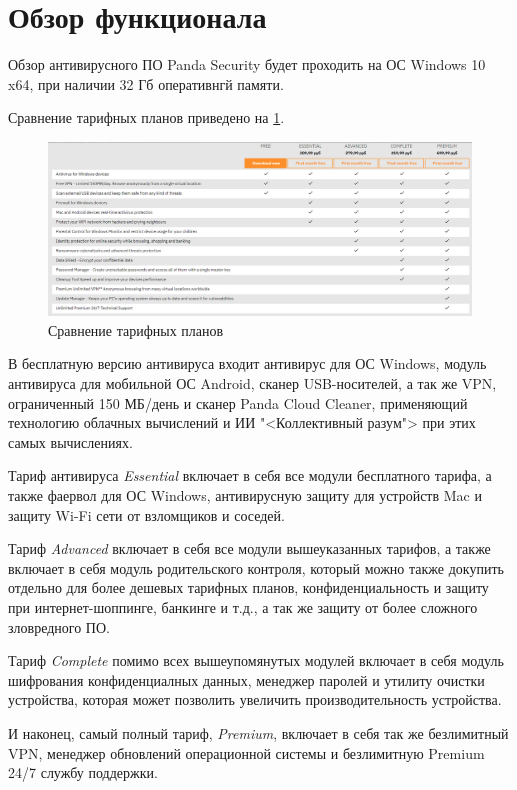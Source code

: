     \section{Обзор функционала}
        Обзор антивирусного ПО Panda Security будет проходить на ОС Windows 10 x64, при наличии 32 Гб оперативнгй памяти.\par
        Сравнение тарифных планов приведено на \ref{tariff_compare}.\par
        \begin{figure}[h]
            \centering
            \includegraphics[width=\textwidth]{pics/compare_tariffs}
            \caption{Сравнение тарифных планов}
            \label{tariff_compare}
        \end{figure}
        В бесплатную версию антивируса входит антивирус для ОС Windows, модуль антивируса для мобильной ОС
        Android, сканер USB-носителей, а так же VPN, ограниченный 150 МБ/день и сканер Panda Cloud Cleaner,
        применяющий технологию облачных вычислений и ИИ "<Коллективный разум"> при этих самых вычислениях.\par
        Тариф антивируса \emph{Essential} включает в себя все модули бесплатного тарифа, а также фаервол для 
        ОС Windows, антивирусную защиту для устройств Mac и защиту Wi-Fi сети от взломщиков и соседей.\par
        Тариф \emph{Advanced} включает в себя все модули вышеуказанных тарифов, а также включает в себя
        модуль родительского контроля, который можно также докупить отдельно для более дешевых тарифных планов,
        конфиденциальность и защиту при интернет-шоппинге, банкинге и т.д., а так же защиту от более сложного
        зловредного ПО.\par
        Тариф \emph{Complete} помимо всех вышеупомянутых модулей включает в себя модуль шифрования конфиденциалных
        данных, менеджер паролей и утилиту очистки устройства, которая может позволить увеличить производительность
        устройства.\par
        И наконец, самый полный тариф, \emph{Premium}, включает в себя так же безлимитный VPN, менеджер 
        обновлений операционной системы и безлимитную Premium 24/7 службу поддержки.
    \pagebreak

